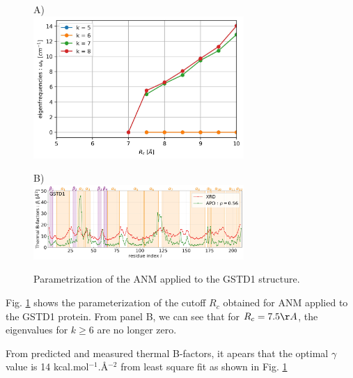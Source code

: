 \begin{figure}[h!]
	\begin{minipage}{.48\linewidth}
		A)\\
		\includegraphics[width = 8cm]{figures/GSTD1_ANM-COM_Rc_param.jpg}
	\end{minipage}
	\begin{minipage}{.48\linewidth}
		B)\\
		\includegraphics[width = 8cm]{figures/GSTD1_ANM-COM_Bfactors.jpg}
	\end{minipage}
	
	\caption{Parametrization of the ANM applied to the GSTD1 structure.}
	\label{params}	
\end{figure}

\noindent Fig. \ref{params} shows the parameterization of the cutoff $R_c$ obtained for ANM applied to the GSTD1 protein. From panel B, we can see that for $R_c = 7.5\AA$, the eigenvalues for $k \ge 6$ are no longer zero.

\noindent From predicted and measured thermal B-factors, it apears that the optimal $\gamma$ value is 14 kcal.mol$^{-1}$.\AA$^{-2}$ from least square fit as shown in Fig. \ref{params}